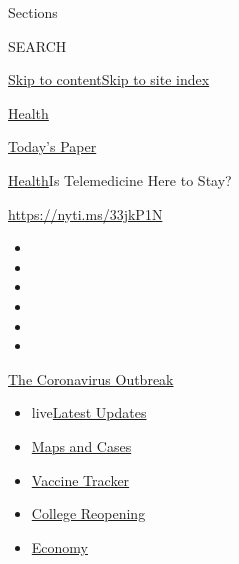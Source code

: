 Sections

SEARCH

\protect\hyperlink{site-content}{Skip to
content}\protect\hyperlink{site-index}{Skip to site index}

\href{https://www.nytimes3xbfgragh.onion/section/health}{Health}

\href{https://myaccount.nytimes3xbfgragh.onion/auth/login?response_type=cookie\&client_id=vi}{}

\href{https://www.nytimes3xbfgragh.onion/section/todayspaper}{Today's
Paper}

\href{/section/health}{Health}\textbar{}Is Telemedicine Here to Stay?

\url{https://nyti.ms/33jkP1N}

\begin{itemize}
\item
\item
\item
\item
\item
\item
\end{itemize}

\href{https://www.nytimes3xbfgragh.onion/news-event/coronavirus?action=click\&pgtype=Article\&state=default\&region=TOP_BANNER\&context=storylines_menu}{The
Coronavirus Outbreak}

\begin{itemize}
\tightlist
\item
  live\href{https://www.nytimes3xbfgragh.onion/2020/08/04/world/coronavirus-covid-19.html?action=click\&pgtype=Article\&state=default\&region=TOP_BANNER\&context=storylines_menu}{Latest
  Updates}
\item
  \href{https://www.nytimes3xbfgragh.onion/interactive/2020/us/coronavirus-us-cases.html?action=click\&pgtype=Article\&state=default\&region=TOP_BANNER\&context=storylines_menu}{Maps
  and Cases}
\item
  \href{https://www.nytimes3xbfgragh.onion/interactive/2020/science/coronavirus-vaccine-tracker.html?action=click\&pgtype=Article\&state=default\&region=TOP_BANNER\&context=storylines_menu}{Vaccine
  Tracker}
\item
  \href{https://www.nytimes3xbfgragh.onion/2020/08/02/us/covid-college-reopening.html?action=click\&pgtype=Article\&state=default\&region=TOP_BANNER\&context=storylines_menu}{College
  Reopening}
\item
  \href{https://www.nytimes3xbfgragh.onion/live/2020/08/03/business/stock-market-today-coronavirus?action=click\&pgtype=Article\&state=default\&region=TOP_BANNER\&context=storylines_menu}{Economy}
\end{itemize}

